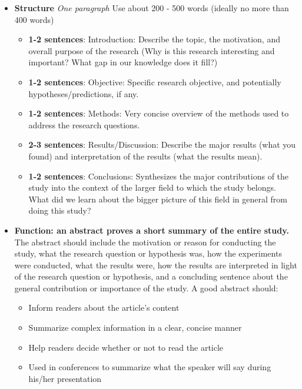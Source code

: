 \documentclass[
]{krantz}
\providecommand{\tightlist}{%
  \setlength{\itemsep}{0pt}\setlength{\parskip}{0pt}}
\begin{document}
\begin{itemize}
\tightlist
\item
  \textbf{Structure} \emph{One paragraph} Use about 200 - 500 words (ideally no more than 400 words)

  \begin{itemize}
  \tightlist
  \item
    \textbf{1-2 sentences}: Introduction: Describe the topic, the motivation, and overall purpose of the research (Why is this research interesting and important? What gap in our knowledge does it fill?)
  \item
    \textbf{1-2 sentences}: Objective: Specific research objective, and potentially hypotheses/predictions, if any.
  \item
    \textbf{1-2 sentences}: Methods: Very concise overview of the methods used to address the research questions.
  \item
    \textbf{2-3 sentences}: Results/Discussion: Describe the major results (what you found) and interpretation of the results (what the results mean).
  \item
    \textbf{1-2 sentences}: Conclusions: Synthesizes the major contributions of the study into the context of the larger field to which the study belongs. What did we learn about the bigger picture of this field in general from doing this study?
  \end{itemize}
\item
  \textbf{Function: an abstract proves a short summary of the entire study.} The abstract should include the motivation or reason for conducting the study, what the research question or hypothesis was, how the experiments were conducted, what the results were, how the results are interpreted in light of the research question or hypothesis, and a concluding sentence about the general contribution or importance of the study. A good abstract should:

  \begin{itemize}
  \tightlist
  \item
    Inform readers about the article's content
  \item
    Summarize complex information in a clear, concise manner
  \item
    Help readers decide whether or not to read the article
  \item
    Used in conferences to summarize what the speaker will say during his/her presentation
  \end{itemize}
\end{itemize}
\end{document}
